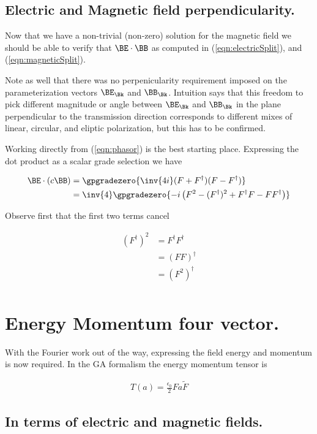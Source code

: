 \subsection{Electric and Magnetic field perpendicularity.}

Now that we have a non-trivial (non-zero) solution for the magnetic field we should be able to verify that $\BE \cdot \BB$ as computed in (\ref{eqn:electricSplit}), and (\ref{eqn:magneticSplit}).

Note as well that there was no perpenicularity requirement imposed on the parameterization vectors $\BE_\Bk$ and $\BB_\Bk$.  Intuition says that this freedom to pick different magnitude or angle between $\BE_\Bk$ and $\BB_\Bk$ in the plane perpendicular to the transmission direction corresponds to different mixes of linear, circular, and eliptic polarization, but this
has to be confirmed.

Working directly from (\ref{eqn:phasor}) is the best starting place.  Expressing the dot product as a scalar grade selection we have

\begin{align*}
\BE \cdot (c \BB) 
&=
\gpgradezero{
\inv{4i}(F + F^\dagger) (F - F^\dagger)
} \\
&=
\inv{4} \gpgradezero{
-i \left( F^2 - (F^\dagger)^2 + F^\dagger F - F F^\dagger \right) } \\
\end{align*}

Observe first that the first two terms cancel

\begin{align*}
(F^\dagger)^2  
&=
F^\dagger F^\dagger \\
&=
(F F)^\dagger \\
&=
(F^2)^\dagger \\
\end{align*}

\section{Energy Momentum four vector.}

With the Fourier work out of the way, expressing the field energy and momentum is now required.  In the GA formalism the energy momentum tensor is

\begin{align}
T(a) = \frac{\epsilon_0}{2} F a \tilde{F}
\end{align}

\subsection{ In terms of electric and magnetic fields. }


